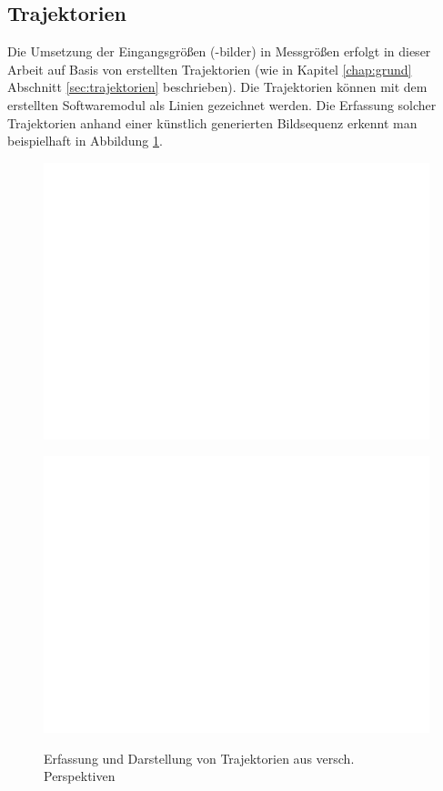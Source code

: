 \subsection{Trajektorien}
Die Umsetzung der Eingangsgrößen (-bilder) in Messgrößen erfolgt in dieser Arbeit auf Basis von erstellten Trajektorien (wie in Kapitel \ref{chap:grund} Abschnitt \ref{sec:trajektorien} beschrieben). 
\newpage
Die Trajektorien können mit dem erstellten Softwaremodul als Linien gezeichnet werden. Die Erfassung solcher Trajektorien anhand einer künstlich generierten Bildsequenz erkennt man beispielhaft in Abbildung \ref{trajektorien}. 
\bigskip
\begin{figure}[H]
\centering
  \begin{minipage}{0.45\textwidth}
    \includegraphics[width=\textwidth]{images/dummy.png}
    \label{a)}
  \end{minipage}
  \begin{minipage}{0.45\textwidth}
    \includegraphics[width=\textwidth]{images/dummy.png}
    \label{b)}
  \end{minipage}
\caption{Erfassung und Darstellung von Trajektorien aus versch. Perspektiven \cite{CourtyPRL2014} \cite{Allain2012ICPR}}
\label{trajektorien}
\end{figure}

